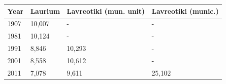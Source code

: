 \documentclass{article}
\begin{document}
\begin{tabular}{llll}
\toprule
Year & Laurium & Lavreotiki (mun. unit) & Lavreotiki (munic.) \\
\midrule
1907 & 10,007 & - & - \\
1981 & 10,124 & - & - \\
1991 & 8,846 & 10,293 & - \\
2001 & 8,558 & 10,612 & - \\
2011 & 7,078 & 9,611 & 25,102 \\
\bottomrule
\end{tabular}
\end{document}
